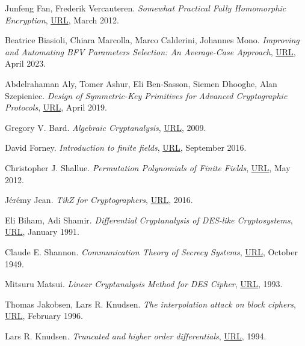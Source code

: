 \documentclass{Resources/UoBLab1}
\theoremstyle{definition}
\begin{document}
\begin{thebibliography}{10}
 Junfeng Fan, Frederik Vercauteren. \textit{Somewhat Practical Fully Homomorphic Encryption}, \href{https://eprint.iacr.org/2012/144.pdf}{URL}, March 2012.

 Beatrice Biasioli, Chiara Marcolla, Marco Calderini, Johannes Mono. \textit{Improving and Automating BFV Parameters Selection: An Average-Case Approach}, \href{https://eprint.iacr.org/2023/600.pdf}{URL}, April 2023.

 Abdelrahaman Aly, Tomer Ashur, Eli Ben-Sasson, Siemen Dhooghe, Alan Szepieniec. \textit{Design of Symmetric-Key Primitives for Advanced Cryptographic Protocols}, \href{https://eprint.iacr.org/2019/426.pdf}{URL}, April 2019.

 Gregory V. Bard. \textit{Algebraic Cryptanalysis}, \href{https://link.springer.com/book/10.1007/978-0-387-88757-9}{URL}, 2009.

 David Forney. \textit{Introduction to finite fields}, \href{http://web.stanford.edu/~marykw/classes/CS250_W19/readings/Forney_Introduction_to_Finite_Fields.pdf}{URL}, September 2016.

 Christopher J. Shallue. \textit{Permutation Polynomials of Finite Fields}, \href{https://arxiv.org/pdf/1211.6044.pdf}{URL}, May 2012.

 J\'er\'emy Jean. \textit{TikZ for Cryptographers}, \href{https://www.iacr.org/authors/tikz/}{URL}, 2016.

 Eli Biham, Adi Shamir. \textit{Differential Cryptanalysis of DES-like Cryptosystems}, \href{https://link.springer.com/content/pdf/10.1007/3-540-38424-3_1.pdf}{URL}, January 1991.

 Claude E. Shannon. \textit{Communication Theory of Secrecy Systems}, \href{https://pages.cs.wisc.edu/~rist/642-spring-2014/shannon-secrecy.pdf}{URL}, October 1949.

 Mitsuru Matsui. \textit{Linear Cryptanalysis Method for DES Cipher}, \href{https://link.springer.com/content/pdf/10.1007/3-540-48285-7_33.pdf}{URL}, 1993.

 Thomas Jakobsen, Lars R. Knudsen. \textit{The interpolation attack on block ciphers}, \href{https://link.springer.com/chapter/10.1007/BFb0052332}{URL}, February 1996.

 Lars R. Knudsen. \textit{Truncated and higher order differentials}, \href{https://link.springer.com/chapter/10.1007/3-540-60590-8_16}{URL}, 1994.


\end{thebibliography}
\end{document}
